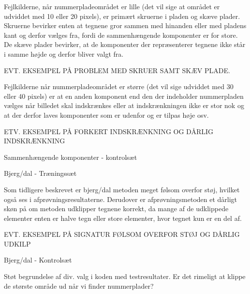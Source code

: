 Fejlkilderne, når nummerpladeområdet er lille (det vil sige at området er udviddet med 10 eller 20 pixels), er primært skruerne i pladen og skæve plader. Skruerne bevirker enten at tegnene gror sammen med hinanden eller med pladens kant og derfor vælges fra, fordi de sammenhængende komponenter er for store. De skæve plader bevirker, at de komponenter der repræsenterer tegnene ikke står i samme højde og derfor bliver valgt fra.

EVT. EKSEMPEL PÅ PROBLEM MED SKRUER SAMT SKÆV PLADE.

Fejlkilderne når nummerpladeområdet er større (det vil sige udviddet med 30 eller 40 pixels) er at en anden komponent end den der indeholder nummerpladen vælges når billedet skal indskrænkes eller at indskrænkningen ikke er stor nok og at der derfor laves komponenter som er udenfor og er tilpas høje osv.

ETV. EKSEMPEL PÅ FORKERT INDSKRÆNKNING OG DÅRLIG INDSKRÆNKNING

Sammenhængende komponenter - kontrolsæt

Bjerg/dal - Træningssæt

Som tidligere beskrevet er bjerg/dal metoden meget følsom overfor støj, hvilket også ses i afprøvningsresultaterne. Derudover er afprøvningsmetoden et dårligt skøn på om metoden udklipper tegnene korrekt, da mange af de udklippede elementer enten er halve tegn eller store elementer, hvor tegnet kun er en del af.

EVT. EKSEMPEL PÅ SIGNATUR FØLSOM OVERFOR STØJ OG DÅRLIG UDKILP

Bjerg/dal - Kontrolsæt

Støt begrundelse af div. valg i koden med testresultater. Er det rimeligt at klippe de største område ud når vi finder nummerplader? 


\begin{comment}
Problemer ved 10: tegn der er smeltet sammen pga. søm skruer: OE26906 og ----290. Godt udskåret: UX33152, skæve plader et problem. go kontrast: YE39734.

Problemer ved 20: for stort område giver komponenter der ikke klippes bort, fordi kontrastforstærkning giver et andet resultat, her ville dynamisk kontrast-blok størrelse måske hjælpe. Dårlig indskrænk XK29750. TS57793: GOD(?) 

Problemer ve 30: stadig for stort område: giver komponenter udenfor der vælges. dårlig indskrænk, især foran? eksempler.

\end{comment}

